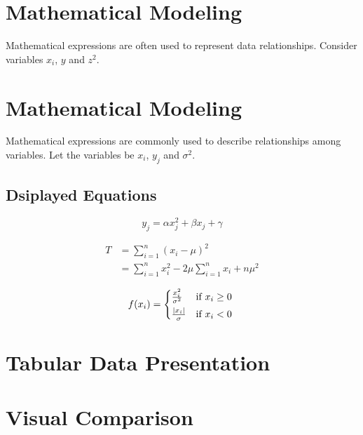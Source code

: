 \documentclass{article}
\begin{document}
\section{Mathematical Modeling}

Mathematical expressions are often used to represent data relationships. Consider variables $x_i$, $y$ and $z^2$.

\section{Mathematical Modeling}
Mathematical expressions are commonly used to describe relationships among variables. Let the variables be $x_i$, $y_j$ and $\sigma^2$.

\subsection{Dsiplayed Equations}
\[y_j = \alpha x_{j}^{2} + \beta x_j + \gamma \tag{1}\]

\begin{align*}
    T &= \sum_{i = 1}^{n} \left( x_i - \mu \right)^2 \\
    &= \sum_{i = 1}^{n} x_i^2 - 2 \mu \sum_{i = 1}^{n} x_i + n \mu^2 \tag{2}
\end{align*}

\[ f(x_i) = \begin{cases*}
    \frac{x_i^2}{\sigma^2} & \text{if} $x_i \geq 0$  \\
    \frac{ \left| x_i \right|}{\sigma} & \text{if} $x_i < 0$  \\
\end{cases*}
\]

\section{Tabular Data Presentation}


\section{Visual Comparison}
\end{document}
